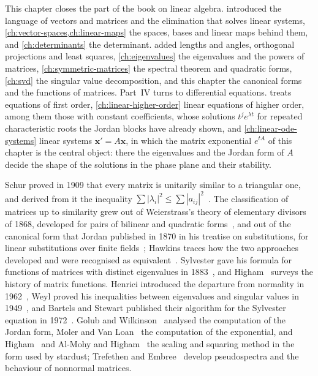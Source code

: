 This chapter closes the part of the book on linear algebra.  introduced the language of vectors and matrices and the elimination that solves linear systems, \cref{ch:vector-spaces,ch:linear-maps} the spaces, bases and linear maps behind them, and \cref{ch:determinants} the determinant.  added lengths and angles, orthogonal projections and least squares, \cref{ch:eigenvalues} the eigenvalues and the powers of matrices, \cref{ch:symmetric-matrices} the spectral theorem and quadratic forms, \cref{ch:svd} the singular value decomposition, and this chapter the canonical forms and the functions of matrices. Part~IV turns to differential equations.  treats equations of first order, \cref{ch:linear-higher-order} linear equations of higher order, among them those with constant coefficients, whose solutions $t^je^{\lambda t}$ for repeated characteristic roots the Jordan blocks have already shown, and \cref{ch:linear-ode-systems} linear systems $\mathbf x'=A\mathbf x$, in which the matrix exponential $e^{tA}$ of this chapter is the central object: there the eigenvalues and the Jordan form of $A$ decide the shape of the solutions in the phase plane and their stability.

\chapternotes

Schur proved in 1909 that every matrix is unitarily similar to a triangular one, and derived from it the inequality $\sum|\lambda_i|^2\le\sum|a_{ij}|^2$~\cite{schur1909}. The classification of matrices up to similarity grew out of Weierstrass's theory of elementary divisors of 1868, developed for pairs of bilinear and quadratic forms~\cite{weierstrass1868}, and out of the canonical form that Jordan published in 1870 in his treatise on substitutions, for linear substitutions over finite fields~\cite{jordan1870}; Hawkins traces how the two approaches developed and were recognised as equivalent~\cite{hawkins1977}. Sylvester gave his formula for functions of matrices with distinct eigenvalues in 1883~\cite{sylvester1883}, and Higham~\cite[Chap.~1]{higham2008} surveys the history of matrix functions. Henrici introduced the departure from normality in 1962~\cite{henrici1962}, Weyl proved his inequalities between eigenvalues and singular values in 1949~\cite{weyl1949}, and Bartels and Stewart published their algorithm for the Sylvester equation in 1972~\cite{bartels1972}. Golub and Wilkinson~\cite{golubwilkinson1976} analysed the computation of the Jordan form, Moler and Van Loan~\cite{moler1978,moler2003} the computation of the exponential, and Higham~\cite{higham2005} and Al-Mohy and Higham~\cite{almohy2009} the scaling and squaring method in the form used by stardust; Trefethen and Embree~\cite{trefethen2005} develop pseudospectra and the behaviour of nonnormal matrices.

